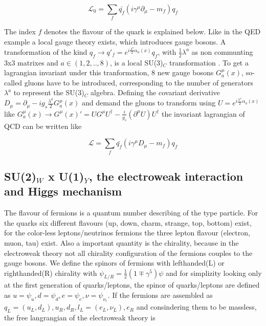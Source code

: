 \begin{equation}
	\label{eq:eq_1_3}
	\mathcal{L}_{0} = \sum_{f} \bar{q_{f}}(i\gamma^{\mu}\partial_{\mu} - m_{f})q_{f}
\end{equation}

The index $f$ denotes the flavour of the quark is explained below. Like in the \acs{QED} example a local gauge theory exists, which introduces gauge bosons. A transformation of the kind $q_{f} \rightarrow q'_{f} = e^{i\frac{\lambda^{a}}{2}\alpha_{a}(x)} q_{f}$, with $\frac{1}{2} \lambda^{a}$ as non communting 3x3 matrixes and $a \in (1, 2, .., 8)$, is a local SU(3)$_{C}$ transformation \cite{QCD}. To get a lagrangian invariant under this tranformation, 8 new gauge bosons $G^{\mu}_{a}(x)$, so-called gluons have to be introduced, corresponding to the number of generators $\lambda^{a}$ to represent the SU(3)$_{C}$ algebra. Defining the covariant derivative $D_{\mu} = \partial_{\mu}-ig_{s}\frac{\lambda^{a}}{2}G^{\mu}_{a}(x)$ and demand the gluons to transform using $U = e^{i\frac{\lambda^{a}}{2}\alpha_{a}(x)}$ like $G^{\mu}_{a}(x) \rightarrow G^{\mu}(x)' = UG^{\mu}U^{\dagger} - \frac{i}{g_s}(\partial^{\mu}U)U^{\dagger}$ the invariant lagrangian of \acs{QCD} can be written like 

\begin{equation}
	\label{eq:eq_1_4}
	\mathcal{L} = \sum_{f} \bar{q_{f}}(i\gamma^{\mu}D_{\mu} - m_{f})q_{f}
\end{equation}

\subsection{SU(2)$_{W}$ x U(1)$_{Y}$, the electroweak interaction and Higgs mechanism}
\label{sec:section_1_1_3}

The flavour of fermions is a quantum number describing of the type particle. For the quarks six different flavours (up, down, charm, strange, top, bottom) exist, for the color-less leptons/neutrinos fermions the three lepton flavour (electron, muon, tau) exist. Also a important quantity is the chirality, because in the electroweak theory not all chirality configuration of the fermions couples to the gauge bosons. We define the spinors of fermions with lefthanded(L) or righthanded(R) chirality with $\psi_{L/R} = \frac{1}{2}(1\mp \gamma^{5})\psi$ and for simplizity looking only at the first generation of quarks/leptons, the spinor of quarks/leptons are defined as $u = \psi_{u}, d = \psi_{d}, e = \psi_{e}, \nu = \psi_{\nu_{e}}$. If the fermions are assembled as $q_{L} = (u_{L}, d_{L}), u_{R}, d_{R}, l_{L} = (e_{L}, \nu_{L}), e_{R}$ and consindering them to be massless, the free langrangian of the electroweak theory is

